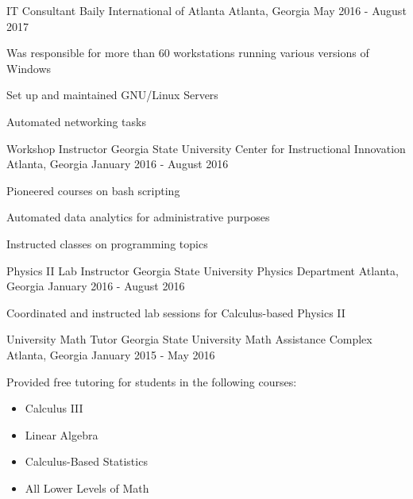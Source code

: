 \begin{cventries}

\cventry
{IT Consultant} %
{Baily International of Atlanta} %
{Atlanta, Georgia} %
{May 2016 - August 2017} %
{ %
\begin{cvitems}
\item {Was responsible for more than 60 workstations running various versions of Windows}
\item {Set up and maintained GNU/Linux Servers}
\item {Automated networking tasks}
\end{cvitems}
}


\cventry
{Workshop Instructor} %
{Georgia State University Center for Instructional Innovation} %
{Atlanta, Georgia} %
{January 2016 - August 2016} %
{ %
\begin{cvitems}
\item {Pioneered courses on bash scripting}
\item {Automated data analytics for administrative purposes}
\item {Instructed classes on programming topics}
\end{cvitems}
}


\cventry
{Physics II Lab Instructor} %
{Georgia State University Physics Department} %
{Atlanta, Georgia} %
{January 2016 - August 2016} %
{ %
\begin{cvitems}
\item {Coordinated and instructed lab sessions for Calculus-based Physics II}
\end{cvitems}
}


\cventry
{University Math Tutor} %
{Georgia State University Math Assistance Complex} %
{Atlanta, Georgia} %
{January 2015 - May 2016} %
{ %
\begin{cvitems}
\item {Provided free tutoring for students in the following courses:}
\begin{itemize}
\item {Calculus III}
\item {Linear Algebra}
\item {Calculus-Based Statistics}
\item {All Lower Levels of Math}
\end{itemize}
\end{cvitems}
}


\end{cventries}
